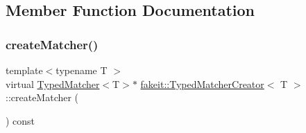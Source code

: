 \subsection{Member Function Documentation}
\mbox{\label{structfakeit_1_1TypedMatcherCreator_a40646cd11f8acf5c34b971f396891d5c}} 
\subsubsection{\texorpdfstring{createMatcher()}{createMatcher()}\hspace{0.1cm}{\footnotesize\ttfamily [1/9]}}
{\footnotesize\ttfamily template$<$typename T $>$ \\
virtual \mbox{\hyperlink{structfakeit_1_1TypedMatcher}{Typed\+Matcher}}$<$T$>$$\ast$ \mbox{\hyperlink{structfakeit_1_1TypedMatcherCreator}{fakeit\+::\+Typed\+Matcher\+Creator}}$<$ T $>$\+::create\+Matcher (\begin{DoxyParamCaption}{ }\end{DoxyParamCaption}) const\hspace{0.3cm}{\ttfamily [pure virtual]}}



